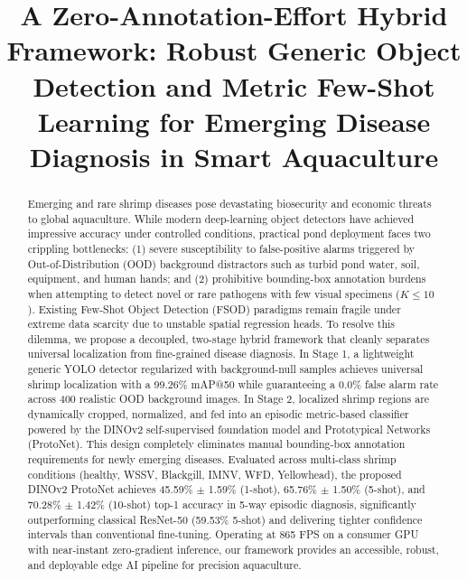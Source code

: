 \documentclass[conference]{IEEEtran}
\begin{document}
\title{A Zero-Annotation-Effort Hybrid Framework: Robust Generic Object Detection and Metric Few-Shot Learning for Emerging Disease Diagnosis in Smart Aquaculture}

\author{
\and
{}
}

\maketitle

\begin{abstract}
Emerging and rare shrimp diseases pose devastating biosecurity and economic threats to global aquaculture. While modern deep-learning object detectors have achieved impressive accuracy under controlled conditions, practical pond deployment faces two crippling bottlenecks: (1) severe susceptibility to false-positive alarms triggered by Out-of-Distribution (OOD) background distractors such as turbid pond water, soil, equipment, and human hands; and (2) prohibitive bounding-box annotation burdens when attempting to detect novel or rare pathogens with few visual specimens ($K \le 10$). Existing Few-Shot Object Detection (FSOD) paradigms remain fragile under extreme data scarcity due to unstable spatial regression heads. To resolve this dilemma, we propose a decoupled, two-stage hybrid framework that cleanly separates universal localization from fine-grained disease diagnosis. In Stage 1, a lightweight generic YOLO detector regularized with background-null samples achieves universal shrimp localization with a 99.26\% mAP@50 while guaranteeing a 0.0\% false alarm rate across 400 realistic OOD background images. In Stage 2, localized shrimp regions are dynamically cropped, normalized, and fed into an episodic metric-based classifier powered by the DINOv2 self-supervised foundation model and Prototypical Networks (ProtoNet). This design completely eliminates manual bounding-box annotation requirements for newly emerging diseases. Evaluated across multi-class shrimp conditions (healthy, WSSV, Blackgill, IMNV, WFD, Yellowhead), the proposed DINOv2 ProtoNet achieves 45.59\% $\pm$ 1.59\% (1-shot), 65.76\% $\pm$ 1.50\% (5-shot), and 70.28\% $\pm$ 1.42\% (10-shot) top-1 accuracy in 5-way episodic diagnosis, significantly outperforming classical ResNet-50 (59.53\% 5-shot) and delivering tighter confidence intervals than conventional fine-tuning. Operating at 865 FPS on a consumer GPU with near-instant zero-gradient inference, our framework provides an accessible, robust, and deployable edge AI pipeline for precision aquaculture.
\end{abstract}
\end{document}
